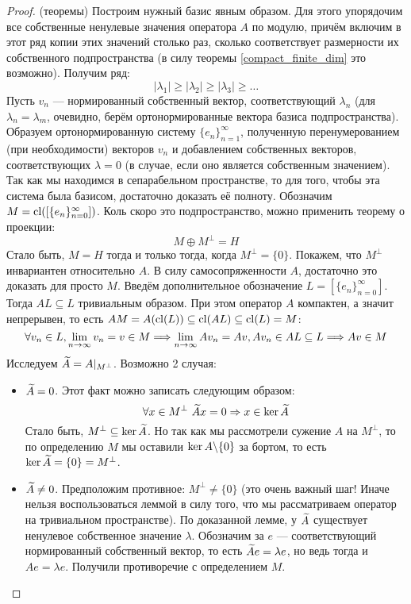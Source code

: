 \begin{proof} (теоремы)
	Построим нужный базис явным образом. Для этого упорядочим все собственные ненулевые значения оператора $A$ по модулю, причём включим в этот ряд копии этих значений столько раз, сколько соответствует размерности их собственного подпространства (в силу теоремы \ref{compact_finite_dim} это возможно). Получим ряд:
	\[
		|\lambda_1| \ge |\lambda_2| \ge |\lambda_3| \ge \ldots
	\]
	Пусть $v_n$ --- нормированный собственный вектор, соответствующий $\lambda_n$ (для $\lambda_n = \lambda_m$, очевидно, берём ортонормированные вектора базиса подпространства). Образуем ортонормированную систему $\{e_n\}_{n = 1}^\infty$, полученную перенумерованием (при необходимости) векторов $v_n$ и добавлением собственных векторов, соответствующих $\lambda = 0$ (в случае, если оно является собственным значением). Так как мы находимся в сепарабельном пространстве, то для того, чтобы эта система была базисом, достаточно доказать её полноту. Обозначим $M = \operatorname{cl}([\{e_n\}_{n = 0}^\infty])$. Коль скоро это подпространство, можно применить теорему о проекции:
	\[
		M \oplus M^\bot = H
	\]
	Стало быть, $M = H$ тогда и только тогда, когда $M^\bot = \{0\}$. Покажем, что $M^\bot$ инвариантен относительно $A$. В силу самосопряженности $A$, достаточно это доказать для просто $M$. Введём дополнительное обозначение $L = [\{e_n\}_{n = 0}^\infty]$. Тогда $AL \subseteq L$ тривиальным образом. При этом оператор $A$ компактен, а значит непрерывен, то есть $AM = A(\operatorname{cl}(L)) \subseteq \operatorname{cl}(AL) \subseteq \operatorname{cl}(L) = M$:
	\[
		\forall v_n \in L, \lim_{n \to \infty} v_n = v \in M \Longrightarrow \lim_{n \to \infty} Av_n = Av, Av_n \in AL \subseteq L \Longrightarrow Av \in M
	\]
	Исследуем $\widetilde{A} = A|_{M^\bot}$. Возможно 2 случая:
	\begin{itemize}
		\item $\widetilde{A} = 0$. Этот факт можно записать следующим образом:
		\[
			\forall x \in M^\bot\ \widetilde{A}x = 0 \Rightarrow x \in \ker \widetilde{A}
		\]
		Стало быть, $M^\bot \subseteq \ker \widetilde{A}$. Но так как мы рассмотрели сужение $A$ на $M^\bot$, то по определению $M$ мы оставили $\ker A \backslash \{0\}$ за бортом, то есть $\ker \widetilde{A} = \{0\} = M^\bot$.
		
		\item $\widetilde{A} \neq 0$. Предположим противное: $M^\bot \neq \{0\}$ (это очень важный шаг! Иначе нельзя воспользоваться леммой в силу того, что мы рассматриваем оператор на тривиальном пространстве). По доказанной лемме, у $\widetilde{A}$ существует ненулевое собственное значение $\lambda$. Обозначим за $e$ --- соответствующий нормированный собственный вектор, то есть $\widetilde{A}e = \lambda e$, но ведь тогда и $Ae = \lambda e$. Получили противоречие с определением $M$.
	\end{itemize}
\end{proof}

